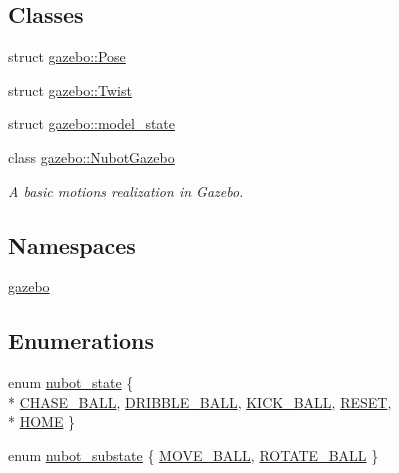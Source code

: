 \subsection*{Classes}
\begin{DoxyCompactItemize}
\item 
struct \hyperlink{structgazebo_1_1Pose}{gazebo\-::\-Pose}
\item 
struct \hyperlink{structgazebo_1_1Twist}{gazebo\-::\-Twist}
\item 
struct \hyperlink{structgazebo_1_1model__state}{gazebo\-::model\-\_\-state}
\item 
class \hyperlink{classgazebo_1_1NubotGazebo}{gazebo\-::\-Nubot\-Gazebo}
\begin{DoxyCompactList}\small\item\em A basic motions realization in Gazebo. \end{DoxyCompactList}\end{DoxyCompactItemize}
\subsection*{Namespaces}
\begin{DoxyCompactItemize}
\item 
\hyperlink{namespacegazebo}{gazebo}
\end{DoxyCompactItemize}
\subsection*{Enumerations}
\begin{DoxyCompactItemize}
\item 
enum \hyperlink{nubot__gazebo_8hh_a9f17572284bab3e9bd067a6393a7953b}{nubot\-\_\-state} \{ \\*
\hyperlink{nubot__gazebo_8hh_a9f17572284bab3e9bd067a6393a7953ba11f40e487a9654ac3bd15a1463898275}{C\-H\-A\-S\-E\-\_\-\-B\-A\-L\-L}, 
\hyperlink{nubot__gazebo_8hh_a9f17572284bab3e9bd067a6393a7953babc8e41c2d63243ae782d425719dd355c}{D\-R\-I\-B\-B\-L\-E\-\_\-\-B\-A\-L\-L}, 
\hyperlink{nubot__gazebo_8hh_a9f17572284bab3e9bd067a6393a7953ba2fc2989f8c52255c003e122db39b885e}{K\-I\-C\-K\-\_\-\-B\-A\-L\-L}, 
\hyperlink{nubot__gazebo_8hh_a9f17572284bab3e9bd067a6393a7953ba589b7d94a3d91d145720e2fed0eb3a05}{R\-E\-S\-E\-T}, 
\\*
\hyperlink{nubot__gazebo_8hh_a9f17572284bab3e9bd067a6393a7953ba8f280224da64e98f2d52d50ec43bc197}{H\-O\-M\-E}
 \}
\item 
enum \hyperlink{nubot__gazebo_8hh_a503a2f01f9f49bd293d3c44faf21b528}{nubot\-\_\-substate} \{ \hyperlink{nubot__gazebo_8hh_a503a2f01f9f49bd293d3c44faf21b528a34c99321316fe6ceed43466e9627a0c5}{M\-O\-V\-E\-\_\-\-B\-A\-L\-L}, 
\hyperlink{nubot__gazebo_8hh_a503a2f01f9f49bd293d3c44faf21b528abdcb91b3f5374a0c1d9e7325816dc93c}{R\-O\-T\-A\-T\-E\-\_\-\-B\-A\-L\-L}
 \}
\end{DoxyCompactItemize}


